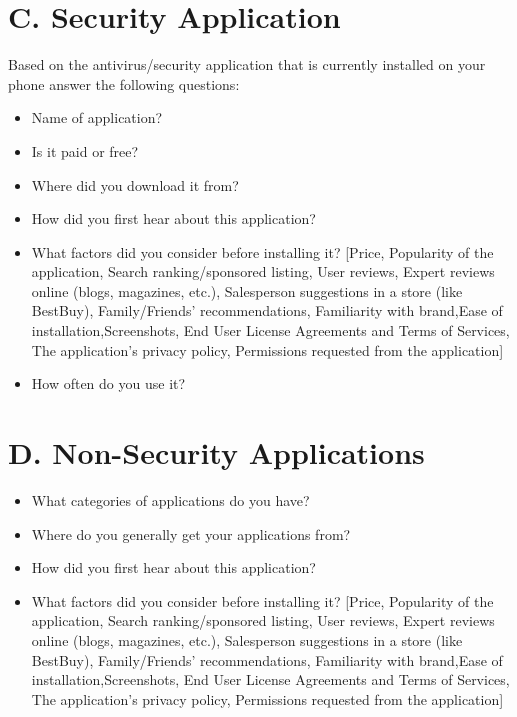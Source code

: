 \documentclass{sigchi}
\begin{document}
\section{C. Security Application}
Based on the antivirus/security application that is currently installed on your phone answer the following questions:
\begin{itemize}
\item Name of application?
\item Is it paid or free?
\item Where did you download it from? 
\item How did you first hear about this application?
\item What factors did you consider before installing it? [Price, Popularity of the application, Search ranking/sponsored listing, User reviews, Expert reviews online (blogs, magazines, etc.), Salesperson suggestions in a store (like BestBuy), Family/Friends' recommendations, Familiarity with brand,Ease of installation,Screenshots, End User License Agreements and Terms of Services, The application's privacy policy, Permissions requested from the application]
\item How often do you use it? 
\end{itemize}
\section{D. Non-Security Applications}
\begin{itemize}
\item What categories of applications do you have?
\item Where do you generally get your applications from? 
\item How did you first hear about this application?
\item What factors did you consider before installing it? [Price, Popularity of the application, Search ranking/sponsored listing, User reviews, Expert reviews online (blogs, magazines, etc.), Salesperson suggestions in a store (like BestBuy), Family/Friends' recommendations, Familiarity with brand,Ease of installation,Screenshots, End User License Agreements and Terms of Services, The application's privacy policy, Permissions requested from the application]
\end{itemize}
\end{document}
